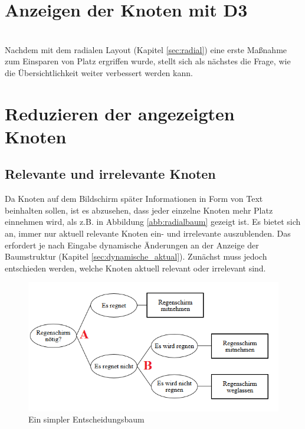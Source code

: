 \section{Anzeigen der Knoten mit D3}
\\
Nachdem mit dem radialen Layout (Kapitel \ref{sec:radial}) eine erste Maßnahme zum Einsparen von Platz ergriffen wurde, stellt sich als nächstes die Frage, wie die Übersichtlichkeit weiter verbessert werden kann.


\section{Reduzieren der angezeigten Knoten}

\subsection{Relevante und irrelevante Knoten}
Da Knoten auf dem Bildschirm später Informationen in Form von Text beinhalten sollen, ist es abzusehen, dass jeder einzelne Knoten mehr Platz einnehmen wird, als z.B. in Abbildung \ref{abb:radialbaum} gezeigt ist. Es bietet sich an, immer nur aktuell relevante Knoten ein- und irrelevante auszublenden. Das erfordert je nach Eingabe dynamische Änderungen an der Anzeige der Baumstruktur (Kapitel \ref{sec:dynamische_aktual}). Zunächst muss jedoch entschieden werden, welche Knoten aktuell relevant oder irrelevant sind. 
\begin{figure}
	\centering
	\includegraphics[width=\linewidth]{../screenshots/entscheidungsbaum_bsp.PNG}
	\caption{Ein simpler Entscheidungsbaum}
	\label{abb:entsch_baum_bsp}
\end{figure}
